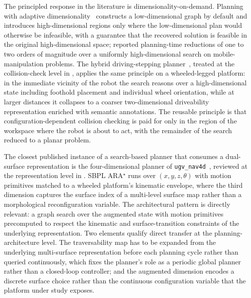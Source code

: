 \documentclass[11pt,a4paper]{article}
\begin{document}
The principled response in the literature is dimensionality-on-demand. Planning with adaptive dimensionality~\parencite{gochev2011adaptive,gochev2013incremental} constructs a low-dimensional graph by default and introduces high-dimensional regions only where the low-dimensional plan would otherwise be infeasible, with a guarantee that the recovered solution is feasible in the original high-dimensional space; reported planning-time reductions of one to two orders of magnitude over a uniformly high-dimensional search on mobile-manipulation problems. The hybrid driving-stepping planner~\parencite{klamtPlanningHybridDrivingStepping2018}, treated at the collision-check level in , applies the same principle on a wheeled-legged platform: in the immediate vicinity of the robot the search reasons over a high-dimensional state including foothold placement and individual wheel orientation, while at larger distances it collapses to a coarser two-dimensional driveability representation enriched with semantic annotations. The reusable principle is that configuration-dependent collision checking is paid for only in the region of the workspace where the robot is about to act, with the remainder of the search reduced to a planar problem.

The closest published instance of a search-based planner that consumes a dual-surface representation is the four-dimensional planner of \texttt{ugv\_nav4d}~\parencite{bockmannUgv_nav4dAdvancedMultiSurface2024}, reviewed at the representation level in . SBPL ARA$^{\star}$ runs over $(x, y, z, \theta)$ with motion primitives matched to a wheeled platform's kinematic envelope, where the third dimension captures the surface index of a multi-level surface map rather than a morphological reconfiguration variable. The architectural pattern is directly relevant: a graph search over the augmented state with motion primitives precomputed to respect the kinematic and surface-transition constraints of the underlying representation. Two elements qualify direct transfer at the planning-architecture level. The traversability map has to be expanded from the underlying multi-surface representation before each planning cycle rather than queried continuously, which fixes the planner's role as a periodic global planner rather than a closed-loop controller; and the augmented dimension encodes a discrete surface choice rather than the continuous configuration variable that the platform under study exposes.
\end{document}
